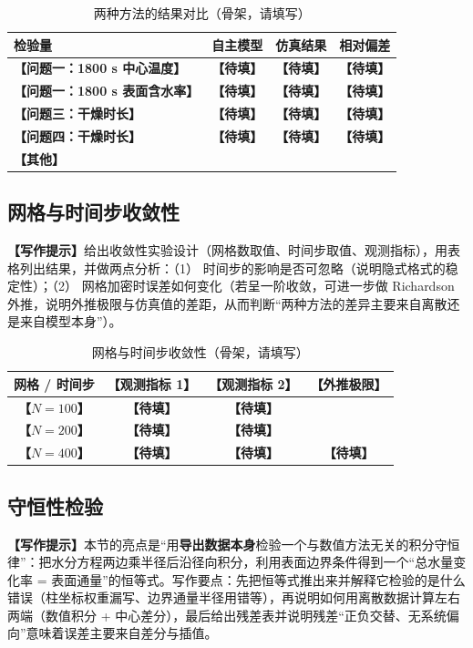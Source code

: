 \documentclass[12pt,a4paper]{article}
\newcommand{\prompt}[1]{\par\noindent\textbf{【写作提示】}#1\par}      %
\newcommand{\ph}[1]{\textbf{【#1】}}                                   %
\begin{document}
\begin{table}[H]
\centering
\caption{两种方法的结果对比（骨架，请填写）}
\label{tab:verify-comsol}
\begin{tabular}{p{5.0cm}ccc}
\toprule
检验量 & 自主模型 & 仿真结果 & 相对偏差\\
\midrule
\ph{问题一：1800 s 中心温度} & \ph{待填} & \ph{待填} & \ph{待填}\\
\ph{问题一：1800 s 表面含水率} & \ph{待填} & \ph{待填} & \ph{待填}\\
\ph{问题三：干燥时长} & \ph{待填} & \ph{待填} & \ph{待填}\\
\ph{问题四：干燥时长} & \ph{待填} & \ph{待填} & \ph{待填}\\
\ph{其他} & & & \\
\bottomrule
\end{tabular}
\end{table}

\subsection{网格与时间步收敛性}

\prompt{给出收敛性实验设计（网格数取值、时间步取值、观测指标），用表格列出结果，并做两点分析：（1） 时间步的影响是否可忽略（说明隐式格式的稳定性）；（2） 网格加密时误差如何变化（若呈一阶收敛，可进一步做 Richardson 外推，说明外推极限与仿真值的差距，从而判断“两种方法的差异主要来自离散还是来自模型本身”）。}

\begin{table}[H]
\centering
\caption{网格与时间步收敛性（骨架，请填写）}
\label{tab:convergence}
\begin{tabular}{cccc}
\toprule
网格 / 时间步 & \ph{观测指标 1} & \ph{观测指标 2} & \ph{外推极限}\\
\midrule
\ph{$N=100$} & \ph{待填} & \ph{待填} & \\
\ph{$N=200$} & \ph{待填} & \ph{待填} & \\
\ph{$N=400$} & \ph{待填} & \ph{待填} & \ph{待填}\\
\bottomrule
\end{tabular}
\end{table}

\subsection{守恒性检验}

\prompt{本节的亮点是“用\textbf{导出数据本身}检验一个与数值方法无关的积分守恒律”：把水分方程两边乘半径后沿径向积分，利用表面边界条件得到一个“总水量变化率 = 表面通量”的恒等式。写作要点：先把恒等式推出来并解释它检验的是什么错误（柱坐标权重漏写、边界通量半径用错等），再说明如何用离散数据计算左右两端（数值积分 + 中心差分），最后给出残差表并说明残差“正负交替、无系统偏向”意味着误差主要来自差分与插值。}
\end{document}
